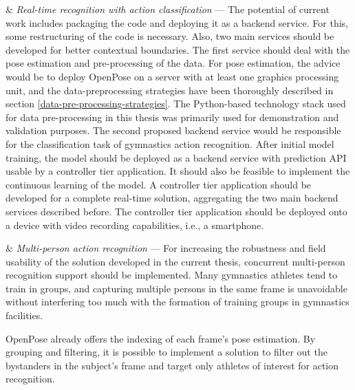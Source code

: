 \begin{easylist}[enumerate]

& \textit{Real-time recognition with action classification} --- The potential of current work includes packaging the code and deploying it as a backend service. For this, some restructuring of the code is necessary. Also, two main services should be developed for better contextual boundaries. The first service should deal with the pose estimation and pre-processing of the data. For pose estimation, the advice would be to deploy OpenPose on a server with at least one graphics processing unit, and the data-preprocessing strategies have been thoroughly described in section \ref{data-pre-processing-strategies}. The Python-based technology stack used for data pre-processing in this thesis was primarily used for demonstration and validation purposes. The second proposed backend service would be responsible for the classification task of gymnastics action recognition. After initial model training, the model should be deployed as a backend service with prediction API usable by a controller tier application. It should also be feasible to implement the continuous learning of the model. A controller tier application should be developed for a complete real-time solution, aggregating the two main backend services described before. The controller tier application should be deployed onto a device with video recording capabilities, i.e., a smartphone.

& \textit{Multi-person action recognition} --- For increasing the robustness and field usability of the solution developed in the current thesis, concurrent multi-person recognition support should be implemented. Many gymnastics athletes tend to train in groups, and capturing multiple persons in the same frame is unavoidable without interfering too much with the formation of training groups in gymnastics facilities. 

OpenPose already offers the indexing of each frame's pose estimation. By grouping and filtering, it is possible to implement a solution to filter out the bystanders in the subject's frame and target only athletes of interest for action recognition.


\end{easylist}
